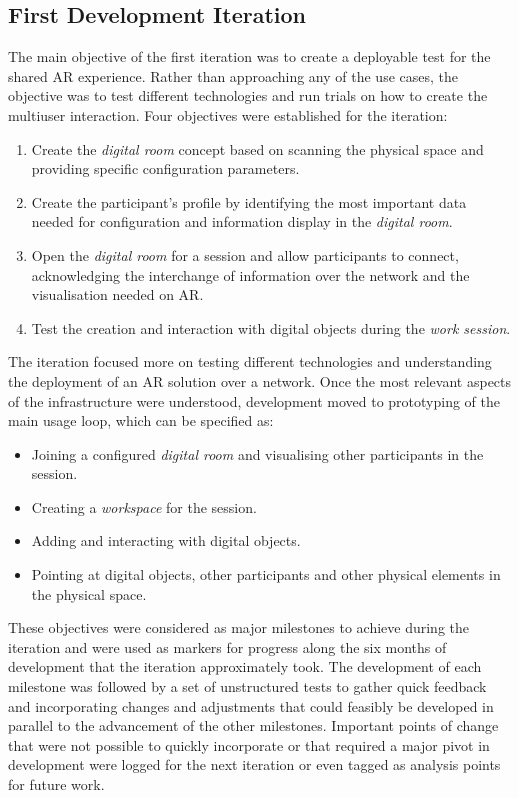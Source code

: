 \subsection{First Development Iteration \label{sec:5-2-1}}

The main objective of the first iteration was to create a deployable test for the shared \ac{AR} experience. Rather than approaching any of the use cases, the objective
was to test different technologies and run trials on how to create the multiuser interaction. Four objectives were established for the iteration:

\begin{enumerate}
    \item Create the \emph{digital room} concept based on scanning the physical space and providing specific configuration parameters.
    \item Create the participant's profile by identifying the most important data needed for configuration and information display in the \emph{digital room}.
    \item Open the \emph{digital room} for a session and allow participants to connect, acknowledging the interchange of information over the network and the visualisation
    needed on \ac{AR}.
    \item Test the creation and interaction with digital objects during the \emph{work session}.
\end{enumerate}

The iteration focused more on testing different technologies and understanding the deployment of an \ac{AR} solution over a network. Once the most relevant aspects of the
infrastructure were understood, development moved to prototyping of the main usage loop, which can be specified as:

\begin{itemize}
    \item Joining a configured \emph{digital room} and visualising other participants in the session.
    \item Creating a \emph{workspace} for the session.
    \item Adding and interacting with digital objects.
    \item Pointing at digital objects, other participants and other physical elements in the physical space.
\end{itemize}

These objectives were considered as major milestones to achieve during the iteration and were used as markers for progress along the six months of development that the
iteration approximately took. The development of each milestone was followed by a set of unstructured tests to gather quick feedback and incorporating changes and
adjustments that could feasibly be developed in parallel to the advancement of the other milestones. Important points of change that were not possible to quickly
incorporate or that required a major pivot in development were logged for the next iteration or even tagged as analysis points for future work.

